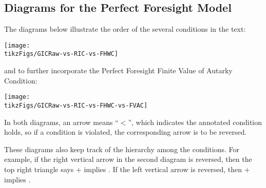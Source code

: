 \documentclass[\econtexRoot/BufferStockTheory]{subfiles}
\begin{document}
  \subsection{Diagrams for the Perfect Foresight Model}
  The diagrams below illustrate the order of the several conditions in the text:
  \providecommand{\tikzFigs}{\econtexRoot/Code/LaTeX}
  \medskip
  
  \centerline{\texttt{[image: \\tikzFigs/GICRaw-vs-RIC-vs-FHWC]}}

  and to further incorporate the Perfect Foresight Finite Value of Autarky Condition:
  
  \centerline{\texttt{[image: \\tikzFigs/GICRaw-vs-RIC-vs-FHWC-vs-FVAC]}}
  
In both diagrams, an arrow means ``$<$'', which indicates the annotated condition holds, so if a condition is violated, the corresponding arrow is to be reversed. 

These diagrams also keep track of the hierarchy among the conditions. For example, if the right vertical arrow in the second diagram is reversed, then the top right triangle says \PFFVAC + \cncl{\FHWC} implies \GICRaw. If the left vertical arrow is reversed, then \cncl{\RIC} + {\GICRaw} implies \cncl{\FHWC}. 

\end{document}
